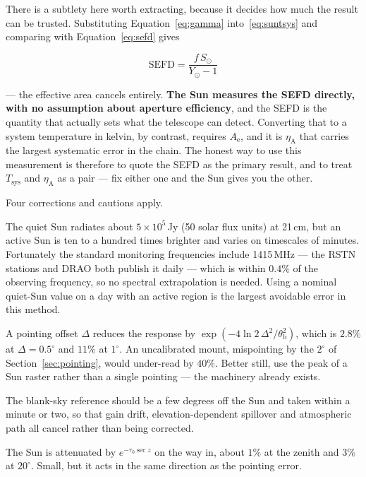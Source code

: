 \documentclass[11pt,a4paper]{article}
\begin{document}
There is a subtlety here worth extracting, because it decides how much the result can be trusted. Substituting Equation~\eqref{eq:gamma} into~\eqref{eq:suntsys} and comparing with Equation~\eqref{eq:sefd} gives

\begin{equation}
\boxed{\ \text{SEFD} = \frac{f\,S_\odot}{Y_\odot - 1}\ }
\label{eq:sefdsun}
\end{equation}

--- the effective area cancels entirely. \textbf{The Sun measures the SEFD directly, with no assumption about aperture efficiency}, and the SEFD is the quantity that actually sets what the telescope can detect. Converting that to a system temperature in kelvin, by contrast, requires $A_\text{e}$, and it is $\eta_\text{A}$ that carries the largest systematic error in the chain. The honest way to use this measurement is therefore to quote the SEFD as the primary result, and to treat $T_\text{sys}$ and $\eta_\text{A}$ as a pair --- fix either one and the Sun gives you the other.

Four corrections and cautions apply.

\begin{description}[style=nextline]
    \item[The solar flux must be contemporaneous, not assumed] The quiet Sun radiates about $5\times10^5$\,Jy (50 solar flux units) at 21\,cm, but an active Sun is ten to a hundred times brighter and varies on timescales of minutes. Fortunately the standard monitoring frequencies include 1415\,MHz --- the RSTN stations and DRAO both publish it daily \cite{rstn} --- which is within $0.4\%$ of the observing frequency, so no spectral extrapolation is needed. Using a nominal quiet-Sun value on a day with an active region is the largest avoidable error in this method.
    \item[Point accurately, and do it after the pointing calibration] A pointing offset $\Delta$ reduces the response by $\exp(-4\ln 2\,\Delta^2/\theta_\text{b}^2)$, which is $2.8\%$ at $\Delta = 0.5^\circ$ and $11\%$ at $1^\circ$. An uncalibrated mount, mispointing by the $2^\circ$ of Section~\ref{sec:pointing}, would under-read by $40\%$. Better still, use the peak of a Sun raster rather than a single pointing --- the machinery already exists.
    \item[Take the reference close by in both angle and time] The blank-sky reference should be a few degrees off the Sun and taken within a minute or two, so that gain drift, elevation-dependent spillover and atmospheric path all cancel rather than being corrected.
    \item[Correct for atmospheric attenuation] The Sun is attenuated by $e^{-\tau_0 \sec z}$ on the way in, about $1\%$ at the zenith and $3\%$ at $20^\circ$. Small, but it acts in the same direction as the pointing error.
\end{description}
\end{document}
